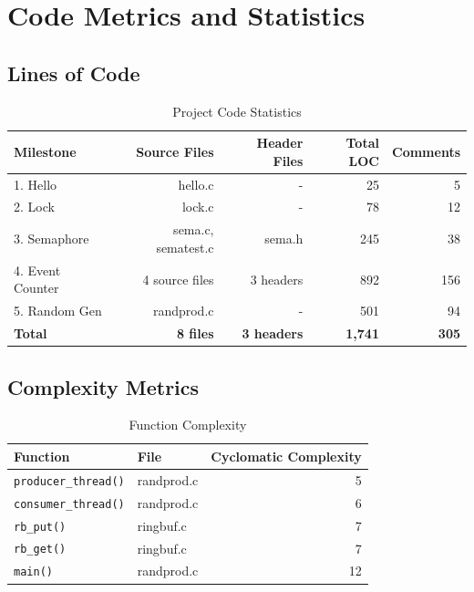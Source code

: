 \documentclass[12pt,a4paper]{article}
\begin{document}
\clearpage

\section{Code Metrics and Statistics}

\subsection{Lines of Code}

\begin{table}[H]
\centering
\caption{Project Code Statistics}
\begin{tabular}{@{}lrrrr@{}}
\toprule
\textbf{Milestone} & \textbf{Source Files} & \textbf{Header Files} & \textbf{Total LOC} & \textbf{Comments} \\ \midrule
1. Hello & hello.c & - & 25 & 5 \\
2. Lock & lock.c & - & 78 & 12 \\
3. Semaphore & sema.c, sematest.c & sema.h & 245 & 38 \\
4. Event Counter & 4 source files & 3 headers & 892 & 156 \\
5. Random Gen & randprod.c & - & 501 & 94 \\ \midrule
\textbf{Total} & \textbf{8 files} & \textbf{3 headers} & \textbf{1,741} & \textbf{305} \\ \bottomrule
\end{tabular}
\end{table}

\subsection{Complexity Metrics}

\begin{table}[H]
\centering
\caption{Function Complexity}
\begin{tabular}{@{}llr@{}}
\toprule
\textbf{Function} & \textbf{File} & \textbf{Cyclomatic Complexity} \\ \midrule
\texttt{producer\_thread()} & randprod.c & 5 \\
\texttt{consumer\_thread()} & randprod.c & 6 \\
\texttt{rb\_put()} & ringbuf.c & 7 \\
\texttt{rb\_get()} & ringbuf.c & 7 \\
\texttt{main()} & randprod.c & 12 \\ \bottomrule
\end{tabular}
\end{table}
\end{document}
